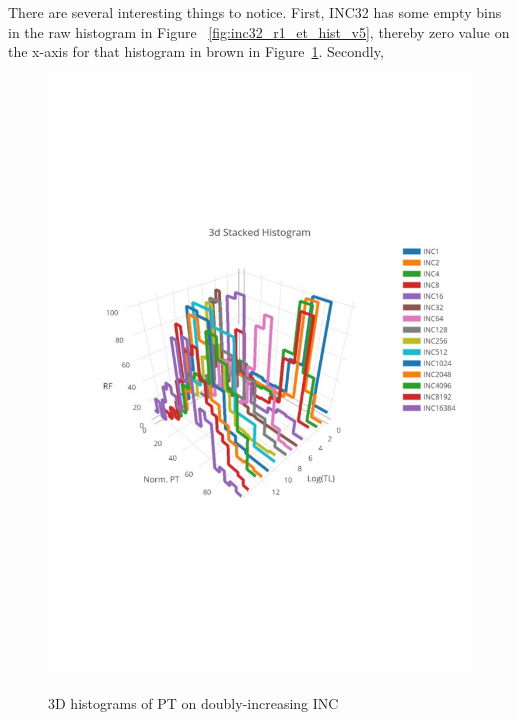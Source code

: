 There are several interesting things to notice. First, INC32 has some empty bins in the raw histogram in Figure ~\ref{fig:inc32_r1_et_hist_v5}, thereby zero value on the x-axis for that histogram in brown in Figure~\ref{fig:hist3d}. 
Secondly, 

\begin{figure}[htp!]
	\centering
	\includegraphics[scale=1]{u_s_time/new_3d_plot}\label{fig:3d_plot}
	\caption{3D histograms of PT on doubly-increasing INC~\label{fig:hist3d}}
\end{figure}


